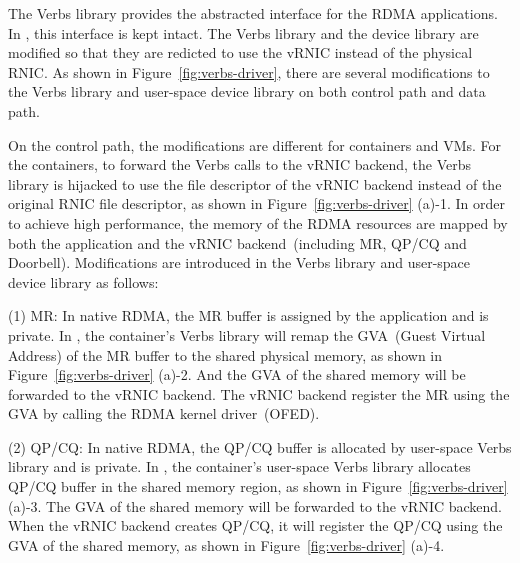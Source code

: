 The Verbs library provides the abstracted interface for the RDMA applications. In \sys, this interface is kept intact.
The Verbs library and the device library are modified so that they are redicted to use the vRNIC instead of the physical RNIC. As shown in Figure~\ref{fig:verbs-driver}, there are several modifications to the Verbs library and user-space device library on both control path and data path.



On the control path, the modifications are different for containers and VMs.
For the containers, to forward the Verbs calls to the vRNIC backend, the Verbs library is hijacked to use the file descriptor of the vRNIC backend instead of the original RNIC file descriptor, as shown in Figure~\ref{fig:verbs-driver} (a)-1. In order to achieve high performance, the memory of the RDMA resources are mapped by both the application and the vRNIC backend~(including MR, QP/CQ and Doorbell). Modifications are introduced in the Verbs library and user-space device library as follows:

(1) MR: In native RDMA, the MR buffer is assigned by the application and is private.
In \sys, the container's Verbs library will remap the GVA~(Guest Virtual Address) of the MR buffer to the shared physical memory, as shown in Figure~\ref{fig:verbs-driver} (a)-2. And the GVA of the shared memory will be forwarded to the vRNIC backend. The vRNIC backend register the MR using the GVA by calling the RDMA kernel driver~(OFED).

(2) QP/CQ: In native RDMA, the QP/CQ buffer is allocated by user-space Verbs library and is private.
In \sys, the container's user-space Verbs library allocates QP/CQ buffer in the shared memory region, as shown in Figure~\ref{fig:verbs-driver} (a)-3. The GVA of the shared memory will be forwarded to the vRNIC backend. When the vRNIC backend creates QP/CQ, it will register the QP/CQ using the GVA of the shared memory, as shown in Figure~\ref{fig:verbs-driver} (a)-4.

